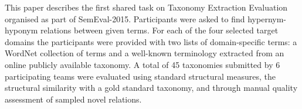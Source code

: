 This paper describes the first shared task on Taxonomy Extraction Evaluation organised as part of SemEval-2015. Participants were asked to find hypernym-hyponym relations between given terms. For each of the four selected target domains the participants were provided with two lists of domain-specific terms: a WordNet collection of terms and a well-known terminology extracted from an online publicly available taxonomy. A total of 45 taxonomies submitted by 6 participating teams were evaluated using standard structural measures, the structural similarity with a gold standard taxonomy, and through manual quality assessment of sampled novel relations.
